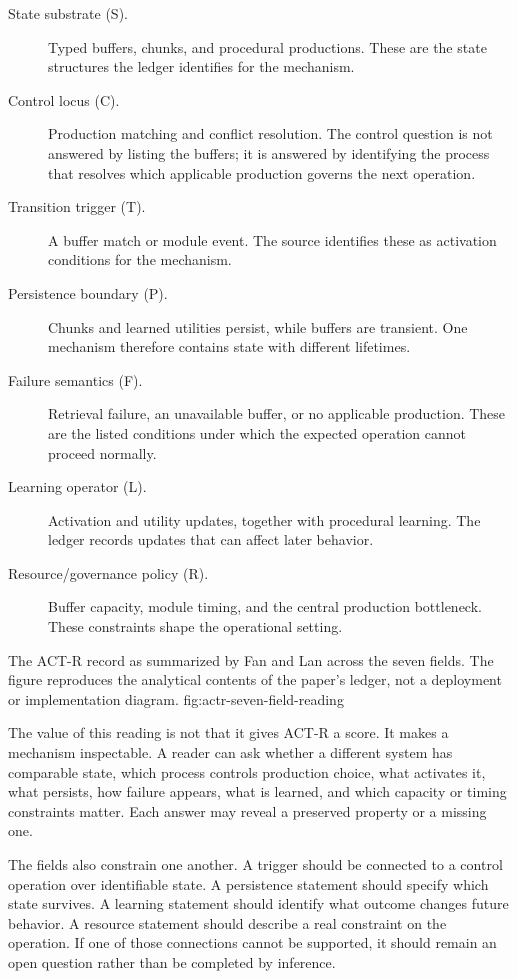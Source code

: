 \begin{description}
  \item[State substrate (S).] Typed buffers, chunks, and procedural productions. These are the state structures the ledger identifies for the mechanism.
  \item[Control locus (C).] Production matching and conflict resolution. The control question is not answered by listing the buffers; it is answered by identifying the process that resolves which applicable production governs the next operation.
  \item[Transition trigger (T).] A buffer match or module event. The source identifies these as activation conditions for the mechanism.
  \item[Persistence boundary (P).] Chunks and learned utilities persist, while buffers are transient. One mechanism therefore contains state with different lifetimes.
  \item[Failure semantics (F).] Retrieval failure, an unavailable buffer, or no applicable production. These are the listed conditions under which the expected operation cannot proceed normally.
  \item[Learning operator (L).] Activation and utility updates, together with procedural learning. The ledger records updates that can affect later behavior.
  \item[Resource/governance policy (R).] Buffer capacity, module timing, and the central production bottleneck. These constraints shape the operational setting.
\end{description}

  {The ACT-R record as summarized by Fan and Lan across the seven fields. The figure reproduces the analytical contents of the paper's ledger, not a deployment or implementation diagram.}
  {fig:actr-seven-field-reading}

The value of this reading is not that it gives ACT-R a score. It makes a mechanism inspectable. A reader can ask whether a different system has comparable state, which process controls production choice, what activates it, what persists, how failure appears, what is learned, and which capacity or timing constraints matter. Each answer may reveal a preserved property or a missing one.

The fields also constrain one another. A trigger should be connected to a control operation over identifiable state. A persistence statement should specify which state survives. A learning statement should identify what outcome changes future behavior. A resource statement should describe a real constraint on the operation. If one of those connections cannot be supported, it should remain an open question rather than be completed by inference.

